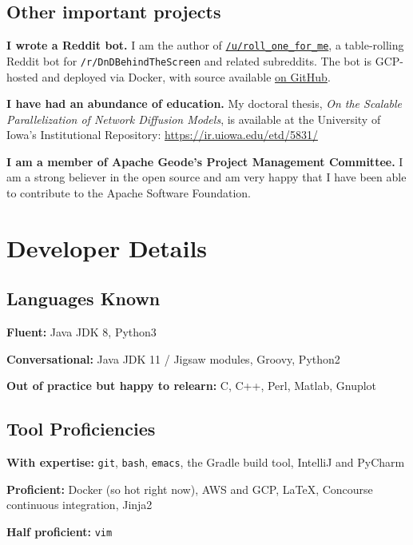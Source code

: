 \documentclass[10pt,letterpaper]{article}
\newcommand\ttt\texttt
\renewenvironment{itemize}{
  \begin{list}{}{
    \setlength{\leftmargin}{1.5em}
    \setlength{\itemsep}{0.25em}
    \setlength{\parskip}{0pt}
    \setlength{\parsep}{0.25em}
  }
}{
  \end{list}
}
\begin{document}
\subsection*{Other important projects}
\begin{itemize}
  \item \textbf{I wrote a Reddit bot.} I am the author of \href{https://www.reddit.com/user/roll_one_for_me}{\ttt{/u/roll\_one\_for\_me}},
    a table-rolling Reddit bot for \ttt{/r/DnDBehindTheScreen} and related subreddits.
    The bot is GCP-hosted and deployed via Docker, with source available \href{https://github.com/PurelyApplied/roll_one_for_me/}{on GitHub}.

  \item \textbf{I have had an abundance of education.} My doctoral thesis, {\em On the Scalable Parallelization of Network Diffusion Models},
    is available at the University of Iowa's Institutional Repository:  \url{https://ir.uiowa.edu/etd/5831/}
    
 \item \textbf{I am a member of Apache Geode's Project Management Committee.}
   I am a strong believer in the open source and am very happy that I have been able to contribute to the Apache Software Foundation.
  
\end{itemize}


\newpage

\section*{Developer Details}
\subsection*{Languages Known}
\begin{itemize}
  \item \textbf{Fluent:}
    Java JDK 8,
    Python3
  \item \textbf{Conversational:}
    Java JDK 11 / Jigsaw modules,
    Groovy,
    Python2
  \item \textbf{Out of practice but happy to relearn:}
    C,
    C++,
    Perl,
    Matlab,
    Gnuplot
\end{itemize}

\subsection*{Tool Proficiencies}
\begin{itemize}
  \item \textbf{With expertise:}
    \ttt{git},
    \ttt{bash},
    \ttt{emacs},
    the Gradle build tool,
    IntelliJ and PyCharm
  \item \textbf{Proficient:} Docker (so hot right now),
    AWS and GCP,
    \LaTeX,
    Concourse continuous integration,
    Jinja2
  \item \textbf{Half proficient:}
    \ttt{vim}
\end{itemize}
\end{document}
